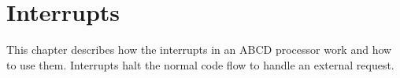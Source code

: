 \documentclass[oneside, a4paper]{memoir}
\begin{document}

\chapter{Interrupts}
\label{ch:Interrupts}
This chapter describes how the interrupts in an ABCD processor work and how to use them. Interrupts halt the normal code flow to handle an external request.
\end{document}
